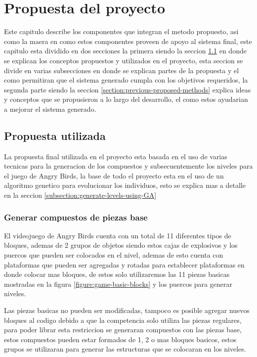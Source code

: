 \chapter{Propuesta del proyecto}
\label{chapter:proposed-method}

Este capitulo describe los componentes que integran el metodo propuesto, asi
como la maera en como estos componentes proveen de apoyo al sistema final, este
capitulo esta dividido en dos secciones la primera siendo la seccion
\ref{section:used-method} en donde se explican los conceptos propuestos y
utilizados en el proyecto, esta seccion se divide en varias subsecciones en
donde se explican partes de la propuesta y el como permitiran que el sistema
generado cumpla con los objetivos requeridos, la segunda parte siendo la seccion
\ref{section:previous-proposed-methods} explica ideas y conceptos que se
propusieron a lo largo del desarrollo, el como estos ayudarian a mejorar el
sistema generado.

\section{Propuesta utilizada}
\label{section:used-method}

La propuesta final utilizada en el proyecto esta basada en el uso de varias
tecnicas para la generacion de los compuestos y subsecuentemente los niveles
para el juego de Angry Birds, la base de todo el proyecto esta en el uso de un
algoritmo genetico para evolucionar los individuos, esto se explica mas a
detalle en la seccion \ref{subsection:generate-levels-using-GA}

\subsection{Generar compuestos de piezas base}
\label{subsection:generate-composites}

El videojuego de Angry Birds cuenta con un total de 11 diferentes tipos de
bloques, ademas de 2 grupos de objetos siendo estos cajas de explosivos y los
puercos que pueden ser colocados en el nivel, ademas de esto cuenta con
plataformas que pueden ser agregadas y rotadas para establecer plataformas en
donde colocar mas bloques, de estos solo utilizaremos las 11 piezas basicas
mostradas en la figura \ref{figure:game-basic-blocks} y los puercos para generar
niveles.

Las piezas basicas no pueden ser modificadas, tampoco es posible agregar nuevos
bloques al codigo debido a que la competencia solo utiliza las piezas regulares,
para poder librar esta restriccion se generaran compuestos con las piezas base,
estos compuestos pueden estar formados de 1, 2 o mas bloques basicos, estos
grupos se utilizaran para generar las estructuras que se colocaran en los niveles.

